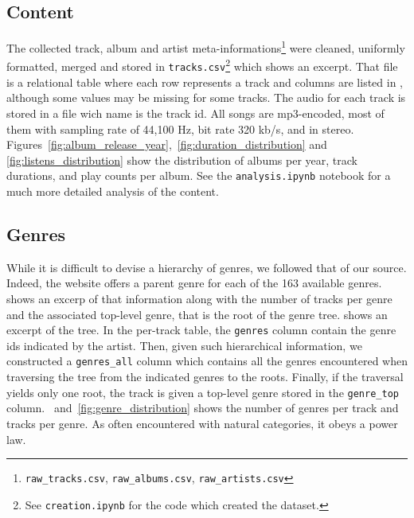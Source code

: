 \documentclass{article}
\newcommand{\todo}[1]{{\color{red} #1}}
\begin{document}
\subsection{Content}

The collected track, album and artist meta-informations\footnote{\texttt{raw\_tracks.csv}, \texttt{raw\_albums.csv}, \texttt{raw\_artists.csv}} were cleaned, uniformly formatted, merged and stored in \texttt{tracks.csv}\footnote{\label{creation}See \texttt{creation.ipynb} for the code which created the dataset.} which  shows an excerpt. That file is a relational table where each row represents a track and columns are listed in , although some values may be missing for some tracks. The audio for each track is stored in a file wich name is the track id. All songs are mp3-encoded, most of them with sampling rate of 44,100 Hz, bit rate 320 kb/s, and in stereo. Figures~\ref{fig:album_release_year},~\ref{fig:duration_distribution} and \ref{fig:listens_distribution} show the distribution of albums per year, track durations, and play counts per album.
See the \texttt{analysis.ipynb} notebook for a much more detailed analysis of the content.


\subsection{Genres}

While it is difficult to devise a hierarchy of genres, we followed that of our source. Indeed, the website offers a parent genre for each of the 163 available genres.  shows an excerp of that information along with the number of tracks per genre and the associated top-level genre, that is the root of the genre tree.  shows an excerpt of the tree.
In the per-track table, the \texttt{genres} column contain the genre ids indicated by the artist. Then, given such hierarchical information, we constructed a \texttt{genres\_all} column which contains all the genres encountered when traversing the tree from the indicated genres to the roots. Finally, if the traversal yields only one root, the track is given a top-level genre stored in the \texttt{genre\_top} column.
~and~\ref{fig:genre_distribution} shows the number of genres per track and tracks per genre. As often encountered with natural categories, it obeys a power law.
 
\end{document}
